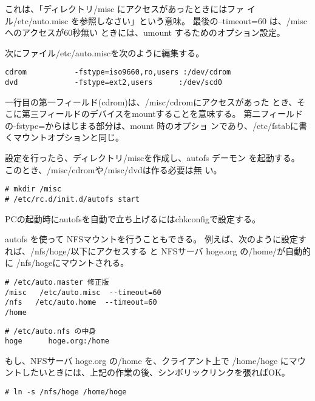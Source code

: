 \documentclass{jreport}
\begin{document}
これは、「ディレクトリ{\ttfamily /misc} にアクセスがあったときにはファ
イル{\ttfamily /etc/auto.misc} を参照しなさい」という意味。
最後の{\ttfamily --timeout=60} は、{\ttfamily /misc} へのアクセスが60秒無い
ときには、umount するためのオプション設定。

次にファイル{\ttfamily /etc/auto.misc}を次のように編集する。
\begin{screen}
\begin{verbatim}
cdrom           -fstype=iso9660,ro,users :/dev/cdrom
dvd             -fstype=ext2,users      :/dev/scd0
\end{verbatim}
\end{screen}

一行目の第一フィールド(cdrom)は、{\ttfamily /misc/cdrom}にアクセスがあった
とき、そこに第三フィールドのデバイスをmountすることを意味する。
第二フィールドの{\ttfamily -fstype=}からはじまる部分は、mount 時のオプショ
ンであり、{\ttfamily /etc/fstab}に書くマウントオプションと同じ。

設定を行ったら、ディレクトリ{\ttfamily /misc}を作成し、autofs デーモン
を起動する。
このとき、{\ttfamily /misc/cdrom}や{\ttfamily /misc/dvd}は作る必要は無
い。
\begin{screen}
\begin{verbatim}
# mkdir /misc
# /etc/rc.d/init.d/autofs start
\end{verbatim}
\end{screen}

PCの起動時にautofsを自動で立ち上げるにはchkconfigで設定する。

autofs を使って NFSマウントを行うこともできる。
例えば、次のように設定すれば、{\ttfamily /nfs/hoge/}以下にアクセスする
と NFSサーバ hoge.org の{\ttfamily /home/}が自動的に{\ttfamily
  /nfs/hoge}にマウントされる。
\begin{screen}
\begin{verbatim}
# /etc/auto.master 修正版
/misc   /etc/auto.misc  --timeout=60
/nfs   /etc/auto.home  --timeout=60
/home
\end{verbatim}
\end{screen}

\begin{screen}
\begin{verbatim}
# /etc/auto.nfs の中身
hoge      hoge.org:/home
\end{verbatim}
\end{screen}

もし、NFSサーバ hoge.org の{\ttfamily /home} を、クライアント上で
{\ttfamily /home/hoge}
にマウントしたいときには、上記の作業の後、シンボリックリンクを張ればOK。
\begin{screen}
\begin{verbatim}
# ln -s /nfs/hoge /home/hoge
\end{verbatim}
\end{screen}
\end{document}
